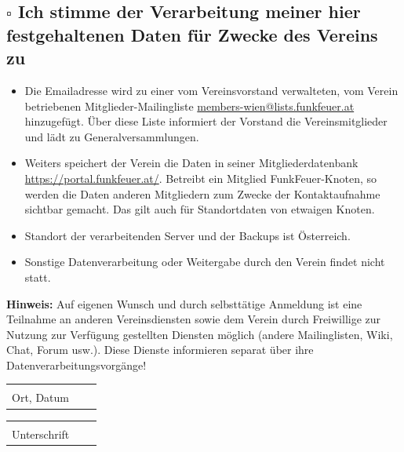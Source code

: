 \documentclass[parskip=half]{scrreprt}
\begin{document}
\subsection*{$\square$ Ich stimme der Verarbeitung meiner hier festgehaltenen Daten für Zwecke des Vereins zu}
\begin{itemize}
    \item Die Emailadresse wird zu einer vom Vereinsvorstand
        verwalteten, vom Verein betriebenen Mitglieder-Mailingliste
        \url{members-wien@lists.funkfeuer.at} hinzugefügt. Über diese
        Liste informiert der Vorstand die Vereinsmitglieder und lädt zu Generalversammlungen.
    \item Weiters speichert der Verein die Daten in seiner
        Mitgliederdatenbank \url{https://portal.funkfeuer.at/}.
        Betreibt ein Mitglied FunkFeuer-Knoten, so werden die Daten
        anderen Mitgliedern zum Zwecke der Kontaktaufnahme sichtbar
        gemacht. Das gilt auch für Standortdaten von etwaigen Knoten.
    \item Standort der verarbeitenden Server und der Backups ist Österreich.
    \item Sonstige Datenverarbeitung oder Weitergabe durch den Verein findet nicht statt.
\end{itemize}

\textbf{Hinweis:} Auf eigenen Wunsch und durch selbsttätige Anmeldung ist eine
Teilnahme an anderen Vereinsdiensten sowie dem Verein durch Freiwillige
zur Nutzung zur Verfügung gestellten Diensten möglich (andere
Mailinglisten, Wiki, Chat, Forum usw.). Diese Dienste informieren
separat über ihre Datenverarbeitungsvorgänge!


\vspace{1.5cm}
\begin{tabular}{p{7cm}p{.5cm}l}
\dotfill \\
Ort, Datum
\end{tabular}
\hfill
\begin{tabular}{p{7cm}p{.5cm}l}
\dotfill \\
Unterschrift
\end{tabular}
\end{document}
